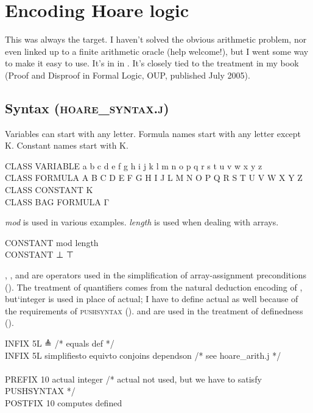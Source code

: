 \chapter{Encoding Hoare logic}
\label{chap:Hoare}

This was always the target. I haven't solved the obvious arithmetic problem, nor even linked up to a finite arithmetic oracle (help welcome!), but I went some way to make it easy to use. It's in  in . It's closely tied to the treatment in my book (Proof and Disproof in Formal Logic, OUP, published July 2005).

\section{Syntax (\textsc{hoare\_syntax.j})}

Variables can start with any letter. Formula names start with any letter except K. Constant names start with K.
\begin{japeish}
CLASS VARIABLE a b c d e f g h i j k l m n o p q r s t u v w x y z  \\
CLASS FORMULA A B C D E F G H I J L M N O P Q R S T U V W X Y Z \\
CLASS CONSTANT K \\
CLASS BAG FORMULA Γ 
\end{japeish}

\textit{mod} is used in various examples. \textit{length} is used when dealing with arrays.
\begin{japeish}
CONSTANT mod length \\
CONSTANT ⊥ ⊤
\end{japeish}

, ,  and  are operators used in the simplification of array-assignment preconditions (). The treatment of quantifiers comes from the natural deduction encoding of , but`integer is used in place of actual; I have to define actual as well because of the requirements of \textsc{pushsyntax} ().  and  are used in the treatment of definedness ().
\begin{japeish}
INFIX   5L  ≜ /* equals def */ \\
INFIX   5L  simplifiesto equivto conjoins dependson /* see hoare\_arith.j */ \\
 \\
PREFIX  10  actual integer /* actual not used, but we have to satisfy PUSHSYNTAX */ \\
POSTFIX 10  computes defined \\
\end{japeish}
 
